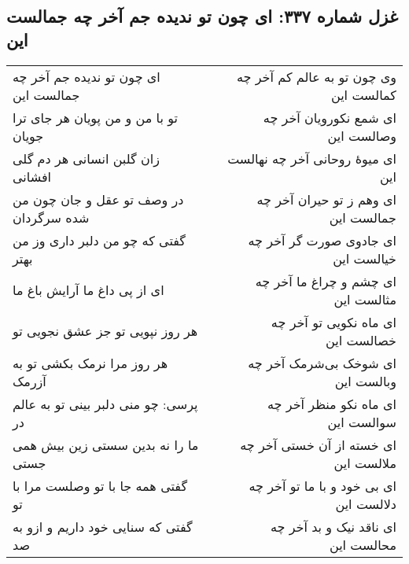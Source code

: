 \begin{center}
\section*{غزل شماره ۳۳۷: ای چون تو ندیده جم آخر چه جمالست این}
\label{sec:337}
\begin{longtable}{l p{0.5cm} r}
ای چون تو ندیده جم آخر چه جمالست این
&&
وی چون تو به عالم کم آخر چه کمالست این
\\
تو با من و من پویان هر جای ترا جویان
&&
ای شمع نکورویان آخر چه وصالست این
\\
زان گلبن انسانی هر دم گلی افشانی
&&
ای میوهٔ روحانی آخر چه نهالست این
\\
در وصف تو عقل و جان چون من شده سرگردان
&&
ای وهم ز تو حیران آخر چه جمالست این
\\
گفتی که چو من دلبر داری وز من بهتر
&&
ای جادوی صورت گر آخر چه خیالست این
\\
ای از پی داغ ما آرایش باغ ما
&&
ای چشم و چراغ ما آخر چه مثالست این
\\
هر روز نپویی تو جز عشق نجویی تو
&&
ای ماه نکویی تو آخر چه خصالست این
\\
هر روز مرا نرمک بکشی تو به آزرمک
&&
ای شوخک بی‌شرمک آخر چه وبالست این
\\
پرسی: چو منی دلبر بینی تو به عالم در
&&
ای ماه نکو منظر آخر چه سوالست این
\\
ما را نه بدین سستی زین بیش همی جستی
&&
ای خسته از آن خستی آخر چه ملالست این
\\
گفتی همه جا با تو وصلست مرا با تو
&&
ای بی خود و با ما تو آخر چه دلالست این
\\
گفتی که سنایی خود داریم و ازو به صد
&&
ای ناقد نیک و بد آخر چه محالست این
\\
\end{longtable}
\end{center}
